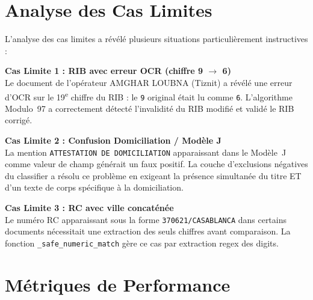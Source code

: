 \section{Analyse des Cas Limites}

L'analyse des cas limites a r\'{e}v\'{e}l\'{e} plusieurs situations particuli\`{e}rement instructives :

\begin{riskbox}
\textbf{Cas Limite 1 : RIB avec erreur OCR (chiffre 9 $\to$ 6)} \\
Le document de l'op\'{e}rateur AMGHAR LOUBNA (Tiznit) a r\'{e}v\'{e}l\'{e} une erreur d'OCR sur le 19\textsuperscript{e} chiffre du RIB : le \texttt{9} original \'{e}tait lu comme \texttt{6}. L'algorithme Modulo~97 a correctement d\'{e}tect\'{e} l'invalidit\'{e} du RIB modifi\'{e} et valid\'{e} le RIB corrig\'{e}.
\end{riskbox}

\begin{riskbox}
\textbf{Cas Limite 2 : Confusion Domiciliation / Mod\`{e}le J} \\
La mention \texttt{ATTESTATION DE DOMICILIATION} apparaissant dans le Mod\`{e}le~J comme valeur de champ g\'{e}n\'{e}rait un faux positif. La couche d'exclusions n\'{e}gatives du classifier a r\'{e}solu ce probl\`{e}me en exigeant la pr\'{e}sence simultan\'{e}e du titre ET d'un texte de corps sp\'{e}cifique \`{a} la domiciliation.
\end{riskbox}

\begin{riskbox}
\textbf{Cas Limite 3 : RC avec ville concat\'{e}n\'{e}e} \\
Le num\'{e}ro RC apparaissant sous la forme \texttt{370621/CASABLANCA} dans certains documents n\'{e}cessitait une extraction des seuls chiffres avant comparaison. La fonction \texttt{\_safe\_numeric\_match} g\`{e}re ce cas par extraction regex des digits.
\end{riskbox}

\section{M\'{e}triques de Performance}

